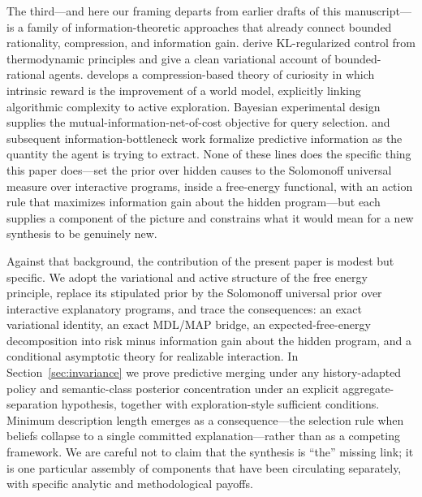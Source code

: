 \documentclass[11pt]{article}
\theoremstyle{remark}
\begin{document}
The third---and here our framing departs from earlier drafts of this manuscript---is a family of information-theoretic approaches that already connect bounded rationality, compression, and information gain. \citet{OrtegaBraun2013} derive KL-regularized control from thermodynamic principles and give a clean variational account of bounded-rational agents. \citet{Schmidhuber2010} develops a compression-based theory of curiosity in which intrinsic reward is the improvement of a world model, explicitly linking algorithmic complexity to active exploration. Bayesian experimental design \citep{Lindley1956,ChalonerVerdinelli1995,MacKay1992} supplies the mutual-information-net-of-cost objective for query selection. \citet{BialekNemenmanTishby2001} and subsequent information-bottleneck work formalize predictive information as the quantity the agent is trying to extract. None of these lines does the specific thing this paper does---set the prior over hidden causes to the Solomonoff universal measure over interactive programs, inside a free-energy functional, with an action rule that maximizes information gain about the hidden program---but each supplies a component of the picture and constrains what it would mean for a new synthesis to be genuinely new.

Against that background, the contribution of the present paper is modest but specific. We adopt the variational and active structure of the free energy principle, replace its stipulated prior by the Solomonoff universal prior over interactive explanatory programs, and trace the consequences: an exact variational identity, an exact MDL/MAP bridge, an expected-free-energy decomposition into risk minus information gain about the hidden program, and a conditional asymptotic theory for realizable interaction. In Section~\ref{sec:invariance} we prove predictive merging under any history-adapted policy and semantic-class posterior concentration under an explicit aggregate-separation hypothesis, together with exploration-style sufficient conditions. Minimum description length \citep{Rissanen1978,WallaceBoulton1968,Grunwald2007} emerges as a consequence---the selection rule when beliefs collapse to a single committed explanation---rather than as a competing framework. We are careful not to claim that the synthesis is ``the'' missing link; it is one particular assembly of components that have been circulating separately, with specific analytic and methodological payoffs.
\end{document}
